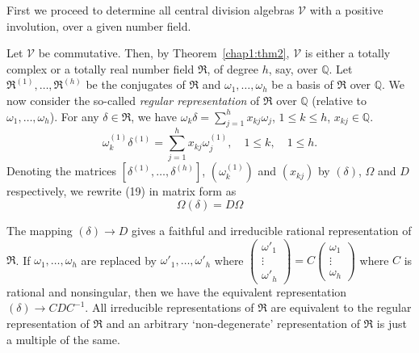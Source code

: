 \begin{remark*}
First we proceed to determine all central division algebras
$\mathscr{V}$ with a positive involution, over a given number field. 

Let \pageoriginale $\mathscr{V}$ be commutative. Then, by Theorem~\ref{chap1:thm2},
$\mathscr{V}$ is either a totally complex or a totally real number
field $\mathfrak{R}$, of degree $h$, say, over $\mathbb{Q}$. Let
$\mathfrak{R}^{(1)},\ldots, \mathfrak{R}^{(h)}$ be the conjugates of
$\mathfrak{R}$ and $\omega_1,\ldots, \omega_h$ be a basis of
$\mathfrak{R}$ over $\mathbb{Q}$. We now consider the so-called 
{\em  regular representation} of $\mathfrak{R}$ over $\mathbb{Q}$
(relative to $\omega_1,\ldots, \omega_h$). For any $\delta \in
\mathfrak{R}$, we have $\omega_k \delta = \sum\limits^h_{j=1} x_{kj}
\omega_j$, $1\leq k \leq h$, $x_{kj} \in \mathbb{Q}$.
\begin{equation*}
\omega^{(1)}_k \delta^{(1)} = \sum^h_{j=1} x_{kj} \omega^{(1)}_j,
\quad 1 \leq k, \quad 1 \leq h. \tag{19}\label{eq19}
\end{equation*}
Denoting the matrices $[\delta^{(1)},\ldots, \delta^{(h)}]$,
$(\omega^{(1)}_k)$ and $(x_{kj})$ by $(\delta)$, $\Omega$ and $D$
respectively, we rewrite (19) in matrix form as
\begin{equation*}
\Omega (\delta) = D \Omega \tag*{$(19)'$}\label{eq19'}
\end{equation*}

The mapping $(\delta)\rightarrow D$ gives a faithful and irreducible
rational representation of $\mathfrak{R}$. If $\omega_1, \ldots ,
\omega_h$ are replaced by $\omega'_1,\ldots, \omega'_h$ where
$\left(\begin{smallmatrix} \omega'_1
  \\ \vdots\\ \omega'_h\end{smallmatrix}\right)  = C
  \left(\begin{smallmatrix}
    \omega_{1}\\ \vdots\\ \omega_{h}\end{smallmatrix}\right)$ where
  $C$ is rational and nonsingular, then we have the equivalent
  representation $(\delta) \rightarrow C D C^{-1}$. All irreducible
  representations of $\mathfrak{R}$ are equivalent to the regular
  representation of $\mathfrak{R}$ and an arbitrary `non-degenerate'
  representation of $\mathfrak{R}$ is just a multiple of the same.


\end{remark*}
